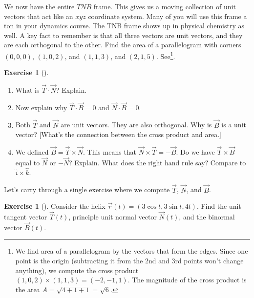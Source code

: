 \documentclass[10pt,]{book}
\theoremstyle{plain}
\theoremstyle{definition}
\theoremstyle{definition}
\theoremstyle{definition}
\theoremstyle{definition}
\newtheorem{exploration}[project]{Exercise}
\theoremstyle{definition}
\numberwithin{equation}{section}
\begin{document}
We now have the entire \(TNB\) frame. This gives us a moving collection of unit vectors that act like an \(xyz\) coordinate system. Many of you will use this frame a ton in your dynamics course. The TNB frame shows up in physical chemistry as well. A key fact to remember is that all three vectors are unit vectors, and they are each orthogonal to the other.%
Find the area of a parallelogram with corners \((0,0,0)\), \((1,0,2)\), and \((1,1,3)\), and \((2,1,5)\). See\footnote{We find area of a parallelogram by the vectors that form the edges. Since one point is the origin (subtracting it from the 2nd and 3rd points won't change anything), we compute the cross product \((1,0,2)\times 
(1,1,3) 
= (-2,-1,1)\). The magnitude of the cross product is the area \(A = \sqrt{4+1+1}=\sqrt{6}\).\label{fn-13}}.%
\begin{exploration}[]\label{exploration-177}
\leavevmode%
\begin{enumerate}[font=\bfseries,label=(\alph*),ref=\alph*]
\item\label{task-438} What is \(\vec T\cdot \vec N\)? Explain.%
\item\label{task-439} Now explain why \(\vec T\cdot \vec B=0\) and \(\vec N\cdot \vec B=0\).%
\item\label{task-440} Both \(\vec T\) and \(\vec N\) are unit vectors. They are also orthogonal. Why is \(\vec B\) is a unit vector? [What's the connection between the cross product and area.]%
\item\label{task-441} We defined \(\vec B=\vec T\times \vec N\). This means that \(\vec N\times \vec T=-\vec B\).  Do we have \(\vec T\times \vec B\) equal to \(\vec N\) or \(-\vec N\)? Explain. What does the right hand rule say? Compare to \(\hat i\times \hat k\).%
%
\end{enumerate}
\end{exploration}
Let's carry through a single exercise where we compute \(\vec T\), \(\vec N\), and \(\vec B\).%
\begin{exploration}[]\label{helix_example_of_T_N_and_B}
Consider the helix \(\vec r(t) = (3\cos t,3\sin t, 4t)\). Find the unit tangent vector \(\vec T(t)\), principle unit normal vector \(\vec N(t)\), and the binormal vector \(\vec B(t)\).%
\end{exploration}
\typeout{************************************************}
\typeout{************************************************}
\end{document}
